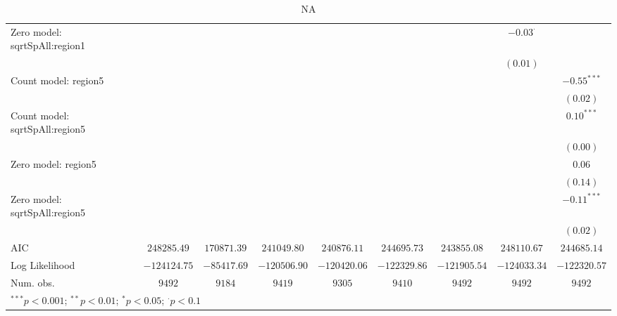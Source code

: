 \begin{sidewaystable}
\begin{center}
{\begin{tabular}{l c c c c c c c c}
Zero model: sqrtSpAll:region1  &               &               &                &               &                &               & $-0.03^{\cdot}$ &                 \\
                               &               &               &                &               &                &               & $(0.01)$        &                 \\
Count model: region5           &               &               &                &               &                &               &                 & $-0.55^{***}$   \\
                               &               &               &                &               &                &               &                 & $(0.02)$        \\
Count model: sqrtSpAll:region5 &               &               &                &               &                &               &                 & $0.10^{***}$    \\
                               &               &               &                &               &                &               &                 & $(0.00)$        \\
Zero model: region5            &               &               &                &               &                &               &                 & $0.06$          \\
                               &               &               &                &               &                &               &                 & $(0.14)$        \\
Zero model: sqrtSpAll:region5  &               &               &                &               &                &               &                 & $-0.11^{***}$   \\
                               &               &               &                &               &                &               &                 & $(0.02)$        \\
\midrule
AIC                            & $248285.49$   & $170871.39$   & $241049.80$    & $240876.11$   & $244695.73$    & $243855.08$   & $248110.67$     & $244685.14$     \\
Log Likelihood                 & $-124124.75$  & $-85417.69$   & $-120506.90$   & $-120420.06$  & $-122329.86$   & $-121905.54$  & $-124033.34$    & $-122320.57$    \\
Num. obs.                      & $9492$        & $9184$        & $9419$         & $9305$        & $9410$         & $9492$        & $9492$          & $9492$          \\
\bottomrule
\multicolumn{9}{l}{\scriptsize{$^{***}p<0.001$; $^{**}p<0.01$; $^{*}p<0.05$; $^{\cdot}p<0.1$}}
\end{tabular}
}
\caption{NA}
\label{acleddead}
\end{center}
\end{sidewaystable}
